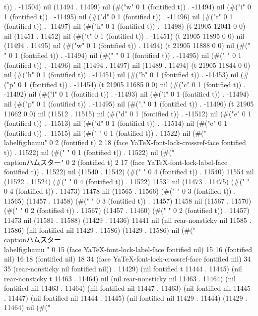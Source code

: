 t)) . -11504) nil (11494 . 11499) nil (#("w" 0 1 (fontified t)) . -11494) nil (#("i" 0 1 (fontified t)) . -11495) nil (#("d" 0 1 (fontified t)) . -11496) nil (#("t" 0 1 (fontified t)) . -11497) nil (#("h" 0 1 (fontified t)) . -11498) (t 21905 12041 0 0) nil (11451 . 11452) nil (#("t" 0 1 (fontified t)) . -11451) (t 21905 11895 0 0) nil (11494 . 11495) nil (#("w" 0 1 (fontified t)) . 11494) (t 21905 11888 0 0) nil (#("
" 0 1 (fontified t)) . -11494) nil (#("	" 0 1 (fontified t)) . -11495) nil (#(" " 0 1 (fontified t)) . -11496) nil (11494 . 11497) nil (11489 . 11494) (t 21905 11844 0 0) nil (#("h" 0 1 (fontified t)) . -11451) nil (#("b" 0 1 (fontified t)) . -11453) nil (#("p" 0 1 (fontified t)) . -11454) (t 21905 11685 0 0) nil (#("c" 0 1 (fontified t)) . -11492) nil (#("l" 0 1 (fontified t)) . -11493) nil (#("i" 0 1 (fontified t)) . -11494) nil (#("p" 0 1 (fontified t)) . -11495) nil (#("," 0 1 (fontified t)) . -11496) (t 21905 11662 0 0) nil (11512 . 11515) nil (#("d" 0 1 (fontified t)) . -11512) nil (#("e" 0 1 (fontified t)) . -11513) nil (#("d" 0 1 (fontified t)) . -11514) nil (#("e" 0 1 (fontified t)) . -11515) nil (#("
" 0 1 (fontified t)) . 11522) nil (#("	 \\label{fig:hamu}" 0 2 (fontified t) 2 18 (face YaTeX-font-lock-crossref-face fontified t)) . 11522) nil (#("
" 0 1 (fontified t)) . 11522) nil (#("	 \\caption{ハムスター}" 0 2 (fontified t) 2 17 (face YaTeX-font-lock-label-face fontified t)) . 11522) nil (11540 . 11542) (#("    " 0 4 (fontified t)) . 11540) 11554 nil (11522 . 11524) (#("    " 0 4 (fontified t)) . 11522) 11531 nil (11473 . 11475) (#("    " 0 4 (fontified t)) . 11473) 11478 nil (11565 . 11566) (#("   " 0 3 (fontified t)) . 11565) (11457 . 11458) (#("   " 0 3 (fontified t)) . 11457) 11458 nil (11567 . 11570) (#("  " 0 2 (fontified t)) . 11567) (11457 . 11460) (#("  " 0 2 (fontified t)) . 11457) 11473 nil (11581 . 11588) (11429 . 11436) 11441 nil (nil rear-nonsticky nil 11585 . 11586) (nil fontified nil 11429 . 11586) (11429 . 11586) nil (#("\\caption{ハムスター}
		\\label{fig:hamu}
" 0 15 (face YaTeX-font-lock-label-face fontified nil) 15 16 (fontified nil) 16 18 (fontified nil) 18 34 (face YaTeX-font-lock-crossref-face fontified nil) 34 35 (rear-nonsticky nil fontified nil)) . 11429) (nil fontified t 11444 . 11445) (nil rear-nonsticky t 11463 . 11464) nil (nil rear-nonsticky nil 11463 . 11464) (nil fontified nil 11463 . 11464) (nil fontified nil 11447 . 11463) (nil fontified nil 11445 . 11447) (nil fontified nil 11444 . 11445) (nil fontified nil 11429 . 11444) (11429 . 11464) nil (#("
